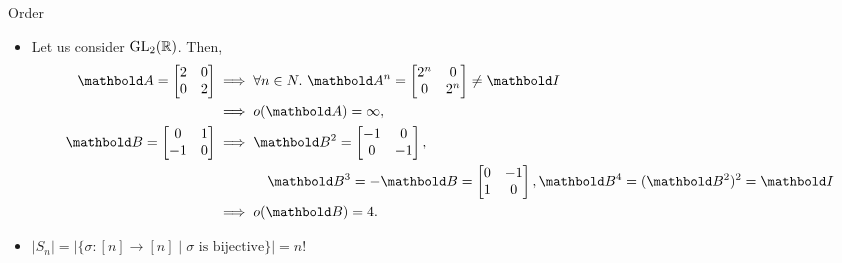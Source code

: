 \begin{ex}{Order}{}
\begin{itemize}
    \item Let us consider $\mathrm{GL}_{2}(\mathbb{R})$. Then, \begin{align*}
        \mA = \begin{bmatrix}
            2 & 0 \\
            0 & 2 \\
        \end{bmatrix} &\implies \forall n \in N.\ \mA^n = \begin{bmatrix}
            2^n & 0 \\
            0 & 2^n \\
        \end{bmatrix} \neq \mI \\ &\implies o(\mA) = \infty, \\
        \mB = \begin{bmatrix}
            0 & 1 \\
            -1 & 0 \\
        \end{bmatrix} &\implies \begin{multlined}[t]\mB^2 = \begin{bmatrix}
            -1 & 0 \\
            0 & -1 \\
        \end{bmatrix}, \\ \mB^3 = -\mB = \begin{bmatrix}
            0 & -1 \\
            1 & 0 \\
        \end{bmatrix}, \mB^4 = (\mB^2)^2 = \mI\end{multlined} \\ &\implies o(\mB) = 4.
    \end{align*}
    
    \item $|S_n| = |\{\sigma : [n] \to [n] \mid \text{$\sigma$ is bijective}\}| = n!$
\end{itemize}
\end{ex}

